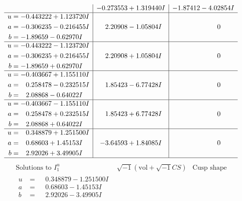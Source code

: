 \documentclass[1p]{elsarticle_modified}
\theoremstyle{definition}
\newcommand{\I}{\sqrt{-1}}
\begin{document}
$$\begin{array}{c|c|c}
 & -0.273553 + 1.319440 I & -1.87412 - 4.02854 I \\ \hline\begin{aligned}
u &= -0.443222 + 1.123720 I \\
a &= -0.306235 - 0.216455 I \\
b &= -1.89659 - 0.62970 I\end{aligned}
 & \phantom{-}2.20908 - 1.05804 I & \phantom{-0.000000 } 0 \\ \hline\begin{aligned}
u &= -0.443222 - 1.123720 I \\
a &= -0.306235 + 0.216455 I \\
b &= -1.89659 + 0.62970 I\end{aligned}
 & \phantom{-}2.20908 + 1.05804 I & \phantom{-0.000000 } 0 \\ \hline\begin{aligned}
u &= -0.403667 + 1.155110 I \\
a &= \phantom{-}0.258478 - 0.232515 I \\
b &= \phantom{-}2.08868 - 0.64022 I\end{aligned}
 & \phantom{-}1.85423 - 6.77428 I & \phantom{-0.000000 } 0 \\ \hline\begin{aligned}
u &= -0.403667 - 1.155110 I \\
a &= \phantom{-}0.258478 + 0.232515 I \\
b &= \phantom{-}2.08868 + 0.64022 I\end{aligned}
 & \phantom{-}1.85423 + 6.77428 I & \phantom{-0.000000 } 0 \\ \hline\begin{aligned}
u &= \phantom{-}0.348879 + 1.251500 I \\
a &= \phantom{-}0.68603 + 1.45153 I \\
b &= \phantom{-}2.92026 + 3.49905 I\end{aligned}
 & -3.64593 + 1.84085 I & \phantom{-0.000000 } 0\\
 \hline 
 \end{array}$$\newpage$$\begin{array}{c|c|c}  
\text{Solutions to }I^u_{1}& \I (\text{vol} + \sqrt{-1}CS) & \text{Cusp shape}\\
 \hline 
\begin{aligned}
u &= \phantom{-}0.348879 - 1.251500 I \\
a &= \phantom{-}0.68603 - 1.45153 I \\
b &= \phantom{-}2.92026 - 3.49905 I\end{aligned}

\end{array}$$
\end{document}

